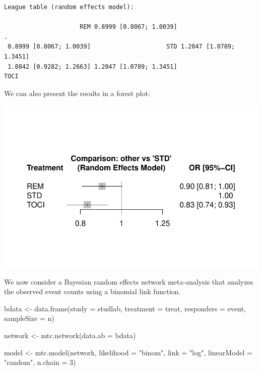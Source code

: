 \documentclass[
  letterpaper,
  DIV=11,
  numbers=noendperiod]{scrreprt}
\newenvironment{Shaded}{\begin{snugshade}}{\end{snugshade}}
\newcommand{\AttributeTok}[1]{\textcolor[rgb]{0.40,0.45,0.13}{#1}}
\newcommand{\DecValTok}[1]{\textcolor[rgb]{0.68,0.00,0.00}{#1}}
\newcommand{\FunctionTok}[1]{\textcolor[rgb]{0.28,0.35,0.67}{#1}}
\newcommand{\NormalTok}[1]{\textcolor[rgb]{0.00,0.23,0.31}{#1}}
\newcommand{\OtherTok}[1]{\textcolor[rgb]{0.00,0.23,0.31}{#1}}
\newcommand{\StringTok}[1]{\textcolor[rgb]{0.13,0.47,0.30}{#1}}
\begin{document}
\begin{verbatim}
League table (random effects model):
                                                                        
                     REM 0.8999 [0.8067; 1.0039]                       .
 0.8999 [0.8067; 1.0039]                     STD 1.2047 [1.0789; 1.3451]
 1.0842 [0.9282; 1.2663] 1.2047 [1.0789; 1.3451]                    TOCI
\end{verbatim}

We can also present the results in a forest plot:

\includegraphics{chapter_10_files/figure-pdf/unnamed-chunk-13-1.pdf}

We now consider a Bayesian random effects network meta-analysis that
analyzes the observed event counts using a binomial link function.

\begin{Shaded}
\begin{Highlighting}[]
\NormalTok{bdata }\OtherTok{\textless{}{-}} \FunctionTok{data.frame}\NormalTok{(}\AttributeTok{study =}\NormalTok{ studlab,}
                    \AttributeTok{treatment =}\NormalTok{ treat,}
                    \AttributeTok{responders =}\NormalTok{ event,}
                    \AttributeTok{sampleSize =}\NormalTok{ n)}

\NormalTok{network }\OtherTok{\textless{}{-}} \FunctionTok{mtc.network}\NormalTok{(}\AttributeTok{data.ab  =}\NormalTok{ bdata)}

\NormalTok{model }\OtherTok{\textless{}{-}} \FunctionTok{mtc.model}\NormalTok{(network,}
                   \AttributeTok{likelihood =} \StringTok{"binom"}\NormalTok{,}
                   \AttributeTok{link =} \StringTok{"log"}\NormalTok{,}
                   \AttributeTok{linearModel =} \StringTok{"random"}\NormalTok{,}
                   \AttributeTok{n.chain =} \DecValTok{3}\NormalTok{)}
\end{Highlighting}
\end{Shaded}
\end{document}
